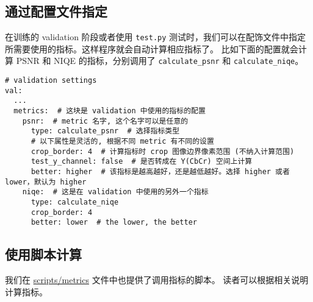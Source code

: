 \documentclass[../main.tex]{subfiles}
\begin{document}
\subsection{通过配置文件指定}

在训练的 validation 阶段或者使用 \texttt{test.py} 测试时，我们可以在配饰文件中指定所需要使用的指标。这样程序就会自动计算相应指标了。
比如下面的配置就会计算 PSNR 和 NIQE 的指标，分别调用了 \texttt{calculate\_psnr} 和 \texttt{calculate\_niqe}。

\begin{verbatim}
# validation settings
val:
  ...
  metrics:  # 这块是 validation 中使用的指标的配置
    psnr:  # metric 名字, 这个名字可以是任意的
      type: calculate_psnr  # 选择指标类型
      # 以下属性是灵活的, 根据不同 metric 有不同的设置
      crop_border: 4  # 计算指标时 crop 图像边界像素范围 (不纳入计算范围)
      test_y_channel: false  # 是否转成在 Y(CbCr) 空间上计算
      better: higher  # 该指标是越高越好，还是越低越好。选择 higher 或者 lower，默认为 higher
    niqe:  # 这是在 validation 中使用的另外一个指标
      type: calculate_niqe
      crop_border: 4
      better: lower  # the lower, the better
\end{verbatim}

\subsection{使用脚本计算}

我们在 \href{https://github.com/XPixelGroup/BasicSR/tree/master/scripts/metrics}{scripts/metrics} 文件中也提供了调用指标的脚本。
读者可以根据相关说明计算指标。
\end{document}
